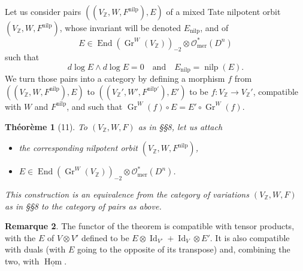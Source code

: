 \documentclass[11pt,a4paper]{article}
\theoremstyle{plain}
\newtheorem{theorem}{Th\'eor\`eme}
\theoremstyle{definition}
\newtheorem{remark}[theorem]{Remarque}
\DeclareMathOperator{\Hom}{Hom}
\DeclareMathOperator{\End}{End}
\DeclareMathOperator{\Gr}{Gr}
\DeclareMathOperator{\Id}{Id}
\DeclareMathOperator{\nilp}{nilp}
\begin{document}
Let us consider pairs $((V_{\mathbb{Z}}, W, F^{\text{nilp}}), E)$ of a mixed Tate nilpotent orbit $(V_{\mathbb{Z}}, W, F^{\text{nilp}})$, whose invariant will be denoted $E_{\text{nilp}}$, and of
\[
E \in \End(\Gr^{W}(V_{\mathbb{Z}}))_{-2} \otimes \mathcal{O}_{\text{mer}}^{*}(D^{n})
\]
such that
\[
d\log E \wedge d\log E = 0 \quad \text{and} \quad E_{\text{nilp}} = \nilp(E).
\]
We turn those pairs into a category by defining a morphism $f$ from $((V_{\mathbb{Z}}, W, F^{\text{nilp}}), E)$ to $((V_{\mathbb{Z}}', W', F^{\text{nilp}\prime}), E')$ to be $f: V_{\mathbb{Z}} \to V_{\mathbb{Z}}'$, compatible with $W$ and $F^{\text{nilp}}$, and such that $\Gr^{W}(f) \circ E = E' \circ \Gr^{W}(f)$.

\begin{theorem}[11]
To $(V_{\mathbb{Z}}, W, F)$ as in \S\S 8, let us attach
\begin{itemize}
\item[(a)] the corresponding nilpotent orbit $(V_{\mathbb{Z}}, W, F^{\text{nilp}})$,
\item[(b)] $E \in \End(\Gr^{W}(V_{\mathbb{Z}}))_{-2} \otimes \mathcal{O}_{\text{mer}}^{*}(D^{n})$.
\end{itemize}
This construction is an equivalence from the category of variations $(V_{\mathbb{Z}}, W, F)$ as in \S\S 8 to the category of pairs as above.
\end{theorem}

\begin{remark}
The functor of the theorem is compatible with tensor products, with the $E$ of $V \otimes V'$ defined to be $E \otimes \Id_{V'} + \Id_{V} \otimes E'$. It is also compatible with duals (with $E$ going to the opposite of its transpose) and, combining the two, with $\underline{\Hom}$.
\end{remark}
\end{document}
